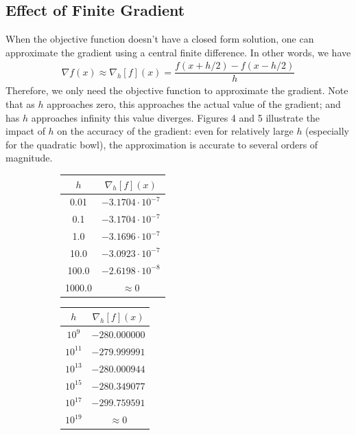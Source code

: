 \documentclass[10pt]{paper}
\begin{document}
\subsection{Effect of Finite Gradient}

When the objective function doesn't have a closed form solution, one can approximate the gradient using a central finite difference. In other words, we have 
\begin{align*}
\nabla f(x) \approx \nabla_h[f](x) = \dfrac{f(x+h/2) - f(x-h/2)}{h}
\end{align*}
Therefore, we only need the objective function to approximate the gradient. Note that as $h$ approaches zero, this approaches the actual value of the gradient; and has $h$ approaches infinity this value diverges. Figures 4 and 5 illustrate the impact of $h$ on the accuracy of the gradient: even for relatively large $h$ (especially for the quadratic bowl), the approximation is accurate to several orders of magnitude.

\begin{figure}[ht!]
  \centering
  \begin{subfigure}
    \centering
      \begin{tabular}{c | c}
      $h$  & $\nabla_h[f](x)$ \\  \hline
    0.01 & $-3.1704 \cdot 10^{-7}$ \\
    0.1 & $-3.1704 \cdot 10^{-7}$ \\
    1.0 & $-3.1696 \cdot 10^{-7}$ \\
    10.0 & $-3.0923 \cdot 10^{-7}$ \\
    100.0 & $-2.6198 \cdot 10^{-8}$ \\
    1000.0 & $\approx 0$ \\
      \end{tabular}
  \end{subfigure}
  \qquad
  \begin{subfigure}
    \centering
      \begin{tabular}{c | c}
      $h$  & $\nabla_h[f](x)$ \\  \hline
    $10^{9}$ & $-280.000000$ \\
    $10^{11}$ & $-279.999991$ \\
    $10^{13}$ & $-280.000944$ \\
    $10^{15}$ & $-280.349077$ \\
    $10^{17}$ & $-299.759591$ \\
    $10^{19}$ & $\approx 0$ \\
      \end{tabular}
  \end{subfigure}
\end{figure}
\end{document}
